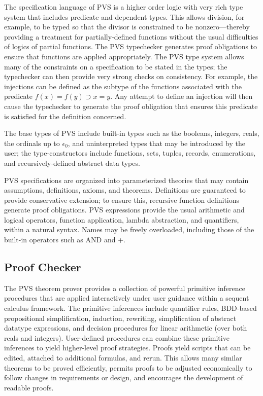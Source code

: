The specification language of PVS is a higher order logic with very
rich type system that includes predicate and dependent types.  This
allows division, for example, to be typed so that the divisor is
constrained to be nonzero---thereby providing a treatment for
partially-defined functions without the usual difficulties of logics
of partial functions.  The PVS typechecker generates proof obligations
to ensure that functions are applied appropriately.  The PVS type
system allows many of the constraints on a specification to be stated
in the types; the typechecker can then provide very strong checks on
consistency.  For example, the injections can be defined as the
subtype of the functions associated with the predicate $f(x)=f(y)
\supset x=y$.  Any attempt to define an injection will then cause the
typechecker to generate the proof obligation that ensures this
predicate is satisfied for the definition concerned.

The base types of PVS include built-in types such as the booleans,
integers, reals, the ordinals up to $\epsilon_0$, and uninterpreted
types that may be introduced by the user; the type-constructors
include functions, sets, tuples, records, enumerations, and
recursively-defined abstract data types.  

PVS specifications are organized into parameterized theories that may
contain assumptions, definitions, axioms, and theorems.  Definitions
are guaranteed to provide conservative extension; to ensure this,
recursive function definitions generate proof obligations.  PVS
expressions provide the usual arithmetic and logical operators,
function application, lambda abstraction, and quantifiers, within a
natural syntax.  Names may be freely overloaded, including those of the
built-in operators such as AND and +.

\subsection{Proof Checker}

The PVS theorem prover provides a collection of powerful primitive
inference procedures that are applied interactively under user
guidance within a sequent calculus framework.  The primitive inferences
include quantifier rules, BDD-based propositional simplification,
induction, rewriting, simplification of abstract datatype expressions,
and decision procedures for linear arithmetic (over both reals and
integers).  User-defined procedures can combine these primitive
inferences to yield higher-level proof strategies.  Proofs yield
scripts that can be edited, attached to additional formulas, and
rerun.  This allows many similar theorems to be proved efficiently,
permits proofs to be adjusted economically to follow changes in
requirements or design, and encourages the development of readable
proofs.

